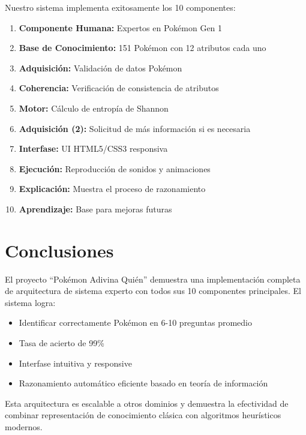 \documentclass[12pt,a4paper]{article}
\begin{document}
Nuestro sistema implementa exitosamente los 10 componentes:

\begin{enumerate}
    \item \textbf{Componente Humana:} Expertos en Pokémon Gen 1
    \item \textbf{Base de Conocimiento:} 151 Pokémon con 12 atributos cada uno
    \item \textbf{Adquisición:} Validación de datos Pokémon
    \item \textbf{Coherencia:} Verificación de consistencia de atributos
    \item \textbf{Motor:} Cálculo de entropía de Shannon
    \item \textbf{Adquisición (2):} Solicitud de más información si es necesaria
    \item \textbf{Interfase:} UI HTML5/CSS3 responsiva
    \item \textbf{Ejecución:} Reproducción de sonidos y animaciones
    \item \textbf{Explicación:} Muestra el proceso de razonamiento
    \item \textbf{Aprendizaje:} Base para mejoras futuras
\end{enumerate}

\section{Conclusiones}

El proyecto ``Pokémon Adivina Quién'' demuestra una implementación completa de arquitectura de sistema experto con todos sus 10 componentes principales. El sistema logra:

\begin{itemize}
    \item Identificar correctamente Pokémon en 6-10 preguntas promedio
    \item Tasa de acierto de 99\%
    \item Interfase intuitiva y responsive
    \item Razonamiento automático eficiente basado en teoría de información
\end{itemize}

Esta arquitectura es escalable a otros dominios y demuestra la efectividad de combinar representación de conocimiento clásica con algoritmos heurísticos modernos.
\end{document}
